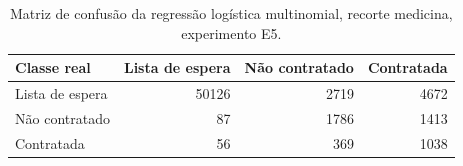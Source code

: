 \begin{table}
\caption{Matriz de confusão da regressão logística multinomial, recorte medicina, experimento E5.}
\label{tab:matriz_confusao_logit_ternario_recorte_medicina_holdout_80_20_e5}
\begin{tabular}{lrrr}
\toprule
Classe real & Lista de espera & Não contratado & Contratada \\
\midrule
Lista de espera & 50126 & 2719 & 4672 \\
Não contratado & 87 & 1786 & 1413 \\
Contratada & 56 & 369 & 1038 \\
\bottomrule
\end{tabular}
\end{table}
